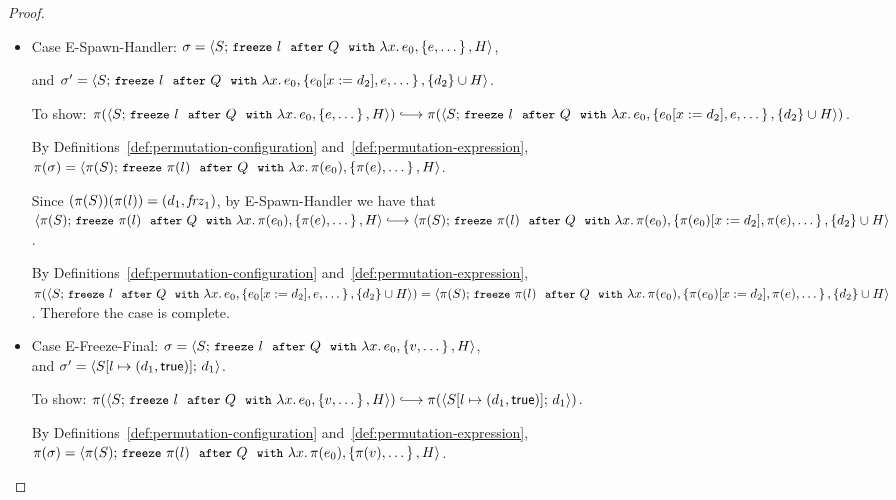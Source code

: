 \begin{proof}
\begin{itemize}
    \item Case {\sc E-Spawn-Handler}: $\sigma =
      \langle S;\, \mbox{\small{\texttt{freeze}}}~l~~{\mbox{\small{\texttt{after}}}}~Q~~{\mbox{\small{\texttt{with}}}}~\lambda x.\,e_0, \left\{e,
            \dots\right\}, H \rangle$,

      and $\sigma' =
      \langle S;\, \mbox{\small{\texttt{freeze}}}~l~~{\mbox{\small{\texttt{after}}}}~Q~~{\mbox{\small{\texttt{with}}}}~\lambda x.\,e_0, \left\{e_0[x := d_2],
            e, \dots\right\}, \{d_2\}\cup H \rangle$.

      To show:
      $\pi(\config{S}{\freezeafterfull{l}{Q}{\lam{x}{e_0}}{\setof{e,
            \dots}}{H}}) \parstepsto \\
      \pi(\config{S}{\freezeafterfull{l}{Q}{\lam{x}{e_0}}{\setof{\subst{e_0}{x}{d_2},
            e, \dots}} {\{d_2\}\cup H}})$.

      By Definitions~\ref{def:permutation-configuration}
      and~\ref{def:permutation-expression}, $\pi(\sigma) = \\
      \langle \pi(S);\, \mbox{\small{\texttt{freeze}}}~\pi(l)~~{\mbox{\small{\texttt{after}}}}~Q~~{\mbox{\small{\texttt{with}}}}~\lambda x.\,\pi(e_0), \left\{\pi(e),
            \dots\right\}, H \rangle$.

      Since $(\pi(S))(\pi(l)) = (d_1, \mathit{frz}_1)$, by {\sc
        E-Spawn-Handler} we have that \\
      $\config{\pi(S)}{\freezeafterfull{\pi(l)}{Q}{\lam{x}{\pi(e_0)}}{\setof{\pi(e),
            \dots}}{H}} \parstepsto \\
      \config{\pi(S)}{\freezeafterfull{\pi(l)}{Q}{\lam{x}{\pi(e_0)}}{\setof{\subst{\pi(e_0)}{x}{d_2},
            \pi(e), \dots}} {\{d_2\}\cup H}}$.

      By Definitions~\ref{def:permutation-configuration}
      and~\ref{def:permutation-expression},
      $\pi(\langle S;\, \mbox{\small{\texttt{freeze}}}~l~~{\mbox{\small{\texttt{after}}}}~Q~~{\mbox{\small{\texttt{with}}}}~\lambda x.\,e_0, \left\{e_0[x := d_2],
            e, \dots\right\}, \{d_2\}\cup H \rangle) =
      \langle \pi(S);\, \mbox{\small{\texttt{freeze}}}~\pi(l)~~{\mbox{\small{\texttt{after}}}}~Q~~{\mbox{\small{\texttt{with}}}}~\lambda x.\,\pi(e_0), \left\{\pi(e_0)[x := d_2],
            \pi(e), \dots\right\}, \{d_2\}\cup H \rangle$.  Therefore the case is
      complete.

    \item Case {\sc E-Freeze-Final}: $\sigma =
      \langle S;\, \mbox{\small{\texttt{freeze}}}~l~~{\mbox{\small{\texttt{after}}}}~Q~~{\mbox{\small{\texttt{with}}}}~\lambda x.\,e_0, \left\{v,
            \dots\right\}, H \rangle$, \\ and $\sigma' =
      \langle S[l \mapsto (d_1, \textsf{true})];\, d_1 \rangle$.

      To show:
      $\pi(\config{S}{\freezeafterfull{l}{Q}{\lam{x}{e_0}}{\setof{v,
            \dots}}{H}}) \parstepsto \\
      \pi(\config{\extS{S}{l}{d_1}{\frozentrue}}{d_1})$.

      By Definitions~\ref{def:permutation-configuration}
      and~\ref{def:permutation-expression}, $\pi(\sigma) = \\
      \langle \pi(S);\, \mbox{\small{\texttt{freeze}}}~\pi(l)~~{\mbox{\small{\texttt{after}}}}~Q~~{\mbox{\small{\texttt{with}}}}~\lambda x.\,\pi(e_0), \left\{\pi(v),
            \dots\right\}, H \rangle$.


\end{itemize}
\end{proof}
